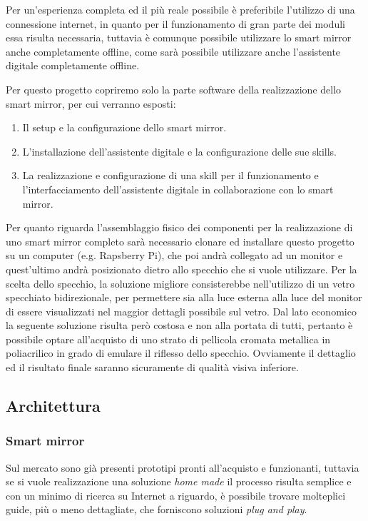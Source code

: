 \documentclass[12pt,a4paper]{article}
\begin{document}
Per un'esperienza completa ed il pi\`u reale possibile \`e preferibile l'utilizzo di una connessione internet,
in quanto per il funzionamento di gran parte dei moduli essa risulta necessaria, tuttavia \`e comunque possibile
utilizzare lo smart mirror anche completamente offline, come sar\`a possibile utilizzare anche l'assistente digitale
completamente offline.

Per questo progetto copriremo solo la parte software della realizzazione dello smart mirror, per cui verranno esposti:
\begin{enumerate}
  \item Il setup e la configurazione dello smart mirror.
  \item L'installazione dell'assistente digitale e la configurazione delle sue skills.
  \item La realizzazione e configurazione di una skill per il funzionamento e l'interfacciamento dell'assistente digitale
      in collaborazione con lo smart mirror.
\end{enumerate}

Per quanto riguarda l'assemblaggio fisico dei componenti per la realizzazione di uno smart mirror completo sar\`a
necessario clonare ed installare questo progetto su un computer (e.g. Rapsberry Pi), che poi andr\`a collegato
ad un monitor e quest'ultimo andr\`a posizionato dietro allo specchio che si vuole utilizzare. Per la scelta dello specchio,
la soluzione migliore consisterebbe nell'utilizzo di un vetro specchiato bidirezionale, per permettere sia alla luce esterna
alla luce del monitor di essere visualizzati nel maggior dettagli possibile sul vetro. Dal lato economico la seguente soluzione
risulta per\`o costosa e non alla portata di tutti, pertanto \`e possibile optare all'acquisto di uno strato di pellicola
cromata metallica in poliacrilico in grado di emulare il riflesso dello specchio. Ovviamente il dettaglio ed il risultato
finale saranno sicuramente di qualit\`a visiva inferiore.

\subsection{Architettura}

\subsubsection{Smart mirror}\label{smartmirror}

Sul mercato sono gi\`a presenti prototipi pronti all'acquisto e funzionanti, tuttavia se si vuole realizzazione
una soluzione \textit{home made} il processo risulta semplice e con un minimo di ricerca su Internet a riguardo,
\`e possibile trovare molteplici guide, pi\`u o meno dettagliate, che forniscono soluzioni \textit{plug and play}.
\end{document}
